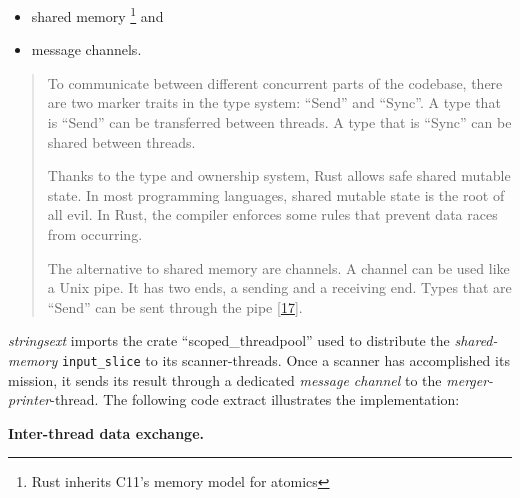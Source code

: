 \begin{itemize}
\item
  shared memory \footnote{Rust inherits C11's memory model for atomics}
  and
\item
  message channels.
\end{itemize}

\begin{quote}
To communicate between different concurrent parts of the codebase, there
are two marker traits in the type system: ``Send'' and ``Sync''. A type
that is ``Send'' can be transferred between threads. A type that is
``Sync'' can be shared between threads.

Thanks to the type and ownership system, Rust allows safe shared mutable
state. In most programming languages, shared mutable state is the root
of all evil. In Rust, the compiler enforces some rules that prevent data
races from occurring.

The alternative to shared memory are channels. A channel can be used
like a Unix pipe. It has two ends, a sending and a receiving end. Types
that are ``Send'' can be sent through the pipe
{[}\protect\hyperlink{bargen2016}{17}{]}.
\end{quote}

\emph{stringsext} imports the crate ``scoped\_threadpool'' used to
distribute the \emph{shared-memory} \texttt{input\_slice} to its
scanner-threads. Once a scanner has accomplished its mission, it sends
its result through a dedicated \emph{message channel} to the
\emph{merger-printer}-thread. The following code extract illustrates the
implementation:

\textbf{Inter-thread data exchange.}

